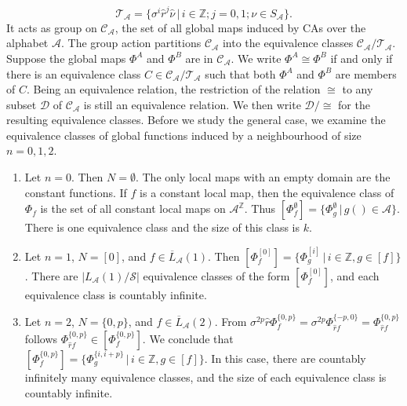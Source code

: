 \documentclass[a4paper]{article}
\begin{document}
\[
\mathcal{T}_\mathcal{A} = \{ \sigma^i \hat{r}^j \hat{\nu} \, | \, i \in \mathbb{Z}; j=0,1; \nu \in S_\mathcal{A} \}.
\]
It acts as group on $\mathcal{C}_\mathcal{A}$, the set of all global maps induced by CAs over the
alphabet $\mathcal{A}$.
The group action partitions $\mathcal{C}_\mathcal{A}$ into the
equivalence classes $\mathcal{C}_\mathcal{A} / \mathcal{T}_\mathcal{A}$.
Suppose the global maps $\Phi^A$ and $\Phi^B$ are in $\mathcal{C}_\mathcal{A}$.
We write $\Phi^A \cong \Phi^B$ if and only if there is an equivalence class
$C \in  \mathcal{C}_\mathcal{A} / \mathcal{T}_\mathcal{A}$ such that
both $\Phi^A$ and $\Phi^B$ are members of $C$.
Being an equivalence relation, the restriction of the relation $\cong$ to
any subset $\mathcal{D}$ of $\mathcal{C}_\mathcal{A}$ is still an equivalence relation.
We then write $\mathcal{D} / {\cong}$ for the resulting equivalence classes.
Before we study the general case, we examine the equivalence classes of global functions induced by
a neighbourhood of size $n=0,1,2$.

\begin{enumerate}

\item Let $n=0$. Then $N=\emptyset$.
The only local maps with an empty domain are the constant functions.
If $f$ is a constant local map, then the equivalence class of $\Phi_f$ is the set
of all constant local maps on $\mathcal{A}^\mathbb{Z}$.
Thus $[\Phi^\emptyset_f] = \{ \Phi^\emptyset_g \, | \, g() \in \mathcal{A} \}$.
There is one equivalence class and the size of this class is $k$.

\item Let $n=1$, $N=[0]$, and $f \in \overline{L}_\mathcal{A}(1)$.
Then $[\Phi^{[0]}_f] = \{ \Phi^{[i]}_g \, | \, i \in \mathbb{Z}, g \in [f] \}$.
There are $|L_\mathcal{A}(1) / \mathcal{S}|$ equivalence classes of the form $[\Phi^{[0]}_f]$,
and each equivalence class is countably infinite.

\item Let $n=2$, $N=\{0,p\}$, and $f \in \overline{L}_\mathcal{A}(2)$.
From
$\sigma^{2p}\hat{r}\Phi^{\{0,p\}}_f = \sigma^{2p}\Phi^{\{-p,0\}}_{\hat{r}f}
= \Phi^{\{0,p\}}_{\hat{r}f}$
follows $\Phi^{\{0,p\}}_{\hat{r}f} \in [\Phi^{\{0,p\}}_f]$.
We conclude that $[\Phi^{\{0,p\}}_f] = \{ \Phi^{\{i,i+p\}}_g \, | \, i \in \mathbb{Z}, g \in [f] \}$.
In this case, there are countably infinitely many equivalence classes, and the size of each
equivalence class is countably infinite.

\end{enumerate}
\end{document}
